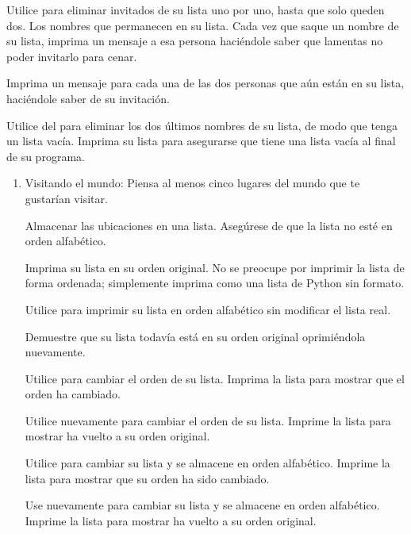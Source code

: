 \begin{enumerate}[4.2.8.4]
	Utilice {} para eliminar invitados de su lista uno por uno, hasta que solo queden dos.
	Los nombres que permanecen en su lista. Cada vez que saque un nombre de su lista, imprima un
	mensaje a esa persona haciéndole saber que lamentas no poder invitarlo para cenar.
	
	Imprima un mensaje para cada una de las dos personas que aún están en su lista, haciéndole saber de su invitación.
	
	Utilice del para  eliminar los dos últimos nombres de su lista, de modo que tenga un lista vacía.
	Imprima su lista para asegurarse que tiene una lista vacía al final de su programa.
	
\end{enumerate}


\begin{enumerate}[4.2.8.8]
	
	\item   Visitando el mundo: Piensa  al menos cinco lugares del mundo que te gustarían visitar.
	
	Almacenar las ubicaciones en una lista. Asegúrese de que la lista no esté en orden alfabético.
	
	Imprima su lista en su orden original. No se preocupe por imprimir la lista de forma ordenada;
	simplemente imprima como una lista de Python sin formato.
	
	
	Utilice {} para imprimir su lista en orden alfabético sin modificar el lista real.
	
	Demuestre que su lista todavía está en su orden original oprimiéndola nuevamente.
	
	Utilice {} para cambiar el orden de su lista. Imprima la lista para mostrar que el orden ha cambiado.
	
	
	Utilice  nuevamente {} para cambiar el orden de su lista. Imprime la lista para mostrar
	ha vuelto a su orden original.
	
	Utilice {} para cambiar su lista y se almacene en orden alfabético. Imprime la lista para mostrar que su orden ha sido cambiado.
	
	Use nuevamente  {} para cambiar su lista y se almacene en orden alfabético. Imprime la lista para mostrar
	ha vuelto a su orden original.
	
	
\end{enumerate}



